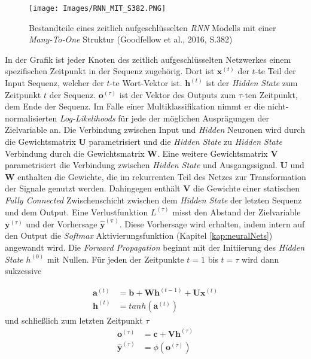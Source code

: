 \documentclass[a4paper,11pt]{article}
\begin{document}
\begin{figure}[!ht]
\begin{center}
\texttt{[image: Images/RNN\_MIT\_S382.PNG]}
\caption{Bestandteile eines zeitlich aufgeschlüsselten \textit{RNN} Modells mit einer \textit{Many-To-One} Struktur (Goodfellow et al., 2016, S.382)}
\label{abb:RNNArch}
\end{center}
\end{figure}

In der Grafik ist jeder Knoten des zeitlich aufgeschlüsselten Netzwerkes einem spezifischen Zeitpunkt in der Sequenz zugehörig.
Dort ist $\bm{x}^{(t)}$ der $t$-te Teil der Input Sequenz, welcher der $t$-te Wort-Vektor ist. $\bm{h}^{(t)}$ ist der \textit{Hidden State} zum Zeitpunkt $t$ der Sequenz. $\bm{o}^{(\tau)}$ ist der Vektor des Outputs zum $\tau$-ten Zeitpunkt, dem Ende der Sequenz. Im Falle einer Multiklassifikation nimmt er die nicht-normalisierten \textit{Log-Likelihoods} für jede der möglichen Ausprägungen der Zielvariable an.
Die Verbindung zwischen Input und \textit{Hidden} Neuronen wird durch die Gewichtsmatrix $\bm{U}$ parametrisiert und die \textit{Hidden State} zu \textit{Hidden State} Verbindung durch die Gewichtsmatrix $\bm{W}$. Eine weitere Gewichtsmatrix $\bm{V}$ parametrisiert die Verbindung zwischen \textit{Hidden State} und Ausgangssignal. $\bm{U}$ und $\bm{W}$ enthalten die Gewichte, die im rekurrenten Teil des Netzes zur Transformation der Signale genutzt werden. Dahingegen enthält $\bm{V}$ die Gewichte einer statischen \textit{Fully Connected} Zwischenschicht zwischen dem \textit{Hidden State} der letzten Sequenz und dem Output.
Eine Verlustfunktion $L^{(\tau)}$ misst den Abstand der Zielvariable $\bm{y}^{(\tau)}$ und der Vorhersage $\bm{\hat{y}^{(\tau)}}$. Diese Vorhersage wird erhalten, indem intern auf den Output die \textit{Softmax} Aktivierungsfunktion (Kapitel \ref{kap:neuralNets}) angewandt wird. Die \textit{Forward Propagation} beginnt mit der Initiierung des \textit{Hidden State} $h^{(0)}$ mit Nullen. Für jeden der Zeitpunkte $t=1$ bis $t = \tau$ wird dann sukzessive 

\begin{align*}
    \bm{a}^{(t)} &= \bm{b} + \bm{W} \bm{h}^{(t-1)} + \bm{U}\bm{x}^{(t)} \\
    \bm{h}^{(t)} &= tanh(\bm{a}^{(t)}) 
\end{align*}
    und schließlich zum letzten Zeitpunkt $\tau$
\begin{align*}
    \bm{o}^{(\tau)} &= \bm{c} + \bm{V}\bm{h}^{(\tau)} \\
    \bm{\hat{y}}^{(\tau)} &= \phi(\bm{o}^{(\tau)})
\end{align*}
\end{document}
